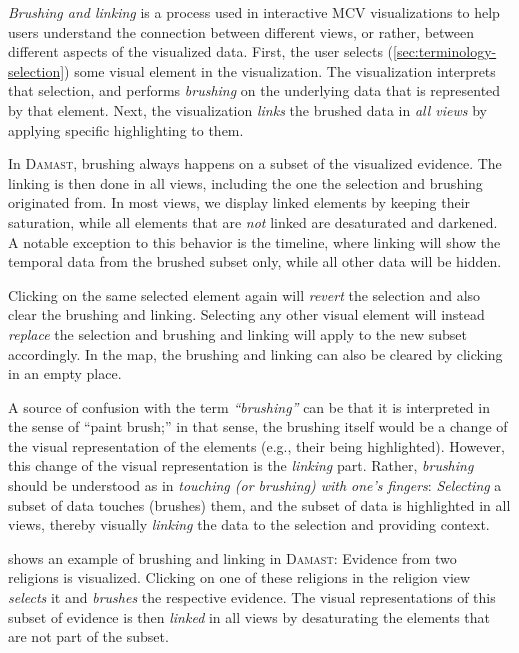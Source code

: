 \emph{Brushing and linking} is a process used in interactive MCV visualizations to help users understand the connection between different views, or rather, between different aspects of the visualized data.
First, the user selects (\cref{sec:terminology-selection}) some visual element in the visualization.
The visualization interprets that selection, and performs \emph{brushing} on the underlying data that is represented by that element.
Next, the visualization \emph{links} the brushed data in \emph{all views} by applying specific highlighting to them.

In \textsc{Damast}, brushing always happens on a subset of the visualized evidence.
The linking is then done in all views, including the one the selection and brushing originated from.
In most views, we display linked elements by keeping their saturation, while all elements that are \emph{not} linked are desaturated and darkened.
A notable exception to this behavior is the timeline, where linking will show the temporal data from the brushed subset only, while all other data will be hidden.

Clicking on the same selected element again will \emph{revert} the selection and also clear the brushing and linking.
Selecting any other visual element will instead \emph{replace} the selection and brushing and linking will apply to the new subset accordingly.
In the map, the brushing and linking can also be cleared by clicking in an empty place.

A source of confusion with the term \emph{\enquote{brushing}} can be that it is interpreted in the sense of \enquote{paint brush;}
in that sense, the brushing itself would be a change of the visual representation of the elements (e.g., their being highlighted).
However, this change of the visual representation is the \emph{linking} part.
Rather, \emph{brushing} should be understood as in \emph{touching (or brushing) with one's fingers}:
\emph{Selecting} a subset of data touches (brushes) them, and the subset of data is highlighted in all views, thereby visually \emph{linking} the data to the selection and providing context.

 shows an example of brushing and linking in \textsc{Damast}:
Evidence from two religions is visualized.
Clicking on one of these religions in the religion view \emph{selects} it and \emph{brushes} the respective evidence.
The visual representations of this subset of evidence is then \emph{linked} in all views by desaturating the elements that are not part of the subset.


